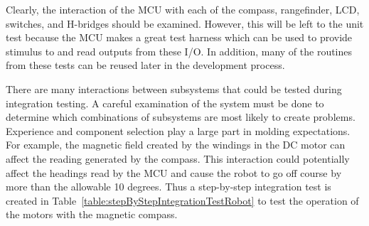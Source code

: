 Clearly, the interaction of the MCU with each of the compass,
rangefinder, LCD, switches, and H-bridges should be examined. However,
this will be left to the unit test because the MCU makes a great test
harness which can be used to provide stimulus to and read outputs from
these I/O. In addition, many of the routines from these tests can be
reused later in the development process.

There are many interactions between subsystems that could be tested
during integration testing. A careful examination of the system must be
done to determine which combinations of subsystems are most likely to
create problems. Experience and component selection play a large part in
molding expectations. For example, the magnetic field created by the
windings in the DC motor can affect the reading generated by the
compass. This interaction could potentially affect the headings read by
the MCU and cause the robot to go off course by more than the allowable
10 degrees. Thus a step-by-step integration test is created in 
Table~\ref{table:stepByStepIntegrationTestRobot}
to test the operation of the motors with the magnetic compass.


